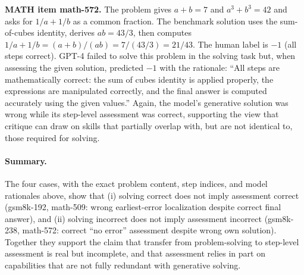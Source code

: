 \textbf{MATH item math-572.} The problem gives $a+b=7$ and $a^3+b^3=42$ and asks for $1/a + 1/b$ as a common fraction. The benchmark solution uses the sum-of-cubes identity, derives $ab = 43/3$, then computes $1/a + 1/b = (a+b)/(ab) = 7/(43/3) = 21/43$. The human label is $-1$ (all steps correct). GPT-4 failed to solve this problem in the solving task but, when assessing the given solution, predicted $-1$ with the rationale: ``All steps are mathematically correct: the sum of cubes identity is applied properly, the expressions are manipulated correctly, and the final answer is computed accurately using the given values.'' Again, the model's generative solution was wrong while its step-level assessment was correct, supporting the view that critique can draw on skills that partially overlap with, but are not identical to, those required for solving.

\paragraph{Summary.}
The four cases, with the exact problem content, step indices, and model rationales above, show that (i) solving correct does not imply assessment correct (gsm8k-192, math-509: wrong earliest-error localization despite correct final answer), and (ii) solving incorrect does not imply assessment incorrect (gsm8k-238, math-572: correct ``no error'' assessment despite wrong own solution). Together they support the claim that transfer from problem-solving to step-level assessment is real but incomplete, and that assessment relies in part on capabilities that are not fully redundant with generative solving.
